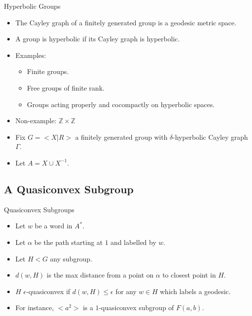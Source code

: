 \documentclass{beamer}
\begin{document}
\begin{frame}{Hyperbolic Groups}

  \begin{itemize}
  \item The Cayley graph of a finitely generated group is a geodesic metric space.
  \item A group is hyperbolic if its Cayley graph is hyperbolic.
  \item Examples:
  \begin{itemize}
    \pause
    \item Finite groups.
    \pause
    \item Free groups of finite rank.
    \pause
    \item Groups acting properly and cocompactly on hyperbolic spaces.
  \end{itemize}
  \pause
  \item Non-example: $\mathbb{Z}\times\mathbb{Z}$
  \pause
  \item Fix $G = <\!\!X | R\!\!>$ a finitely generated group with $\delta$-hyperbolic Cayley graph $\Gamma$.
  \item Let $A = X \cup X^{-1}$.
  \end{itemize}

\end{frame}


\subsection{A Quasiconvex Subgroup}

\begin{frame}{Quasiconvex Subgroups}
  \begin{itemize}
    \item Let $w$ be a word in $A^*$.
	\item Let $\alpha$ be the path starting at $1$ and labelled by $w$.
	\item Let $H < G$ any subgroup.
	\pause
	\item $d(w, H)$ is the max distance from a point on $\alpha$ to closest point in $H$.
  	\begin{figure}
	
	\end{figure}
	\pause
	\item $H$ $\epsilon$-quasiconvex if $d(w, H) \le \epsilon$ for any $w \in H$ which labels a geodesic.
	\pause
	\item For instance, $<\!\!a^2\!\!>$ is a $1$-quasiconvex subgroup of $F(a, b)$.
  \end{itemize}
\end{frame}
\end{document}
